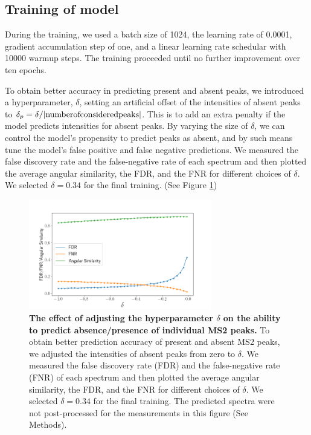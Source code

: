 \documentclass[10pt,a4paper]{article}
\begin{document}
\subsection*{Training of model}

During the training, we used a batch size of 1024, the learning rate of 0.0001, gradient accumulation step of one, and a linear learning rate schedular with 10000 warmup steps. The training proceeded until no further improvement over ten epochs.

To obtain better accuracy in predicting present and absent peaks, we introduced a hyperparameter, $\delta$, setting an artificial offset of the intensities of absent peaks to $\delta_p =\delta / |\rm{number of considered peaks}|$. This is to add an extra penalty if the model predicts intensities for absent peaks. By varying the size of $\delta$, we can control the model’s propensity to predict peaks as absent, and by such means tune the model’s false positive and false negative predictions. We measured the false discovery rate and the false-negative rate of each spectrum and then plotted the average angular similarity, the FDR, and the FNR for different choices of $\delta$. We selected $\delta=0.34$ for the final training. (See Figure \ref{fig:delta})


\begin{figure}[htb]
\centering
\includegraphics[width=8cm]{./img/compare_delta.png}
\caption{{\bf The effect of adjusting the hyperparameter $\delta$ on the ability to predict absence/presence of individual MS2 peaks.} To obtain better prediction accuracy of present and absent MS2 peaks, we adjusted the intensities of absent peaks from zero to $\delta$. We measured the false discovery rate (FDR) and the false-negative rate (FNR) of each spectrum and then plotted the average angular similarity, the FDR, and the FNR for different choices of $\delta$. We selected $\delta=0.34$ for the final training.  The predicted spectra were not post-processed for the measurements in this figure (See Methods). \label{fig:delta}}
\end{figure}
\end{document}

